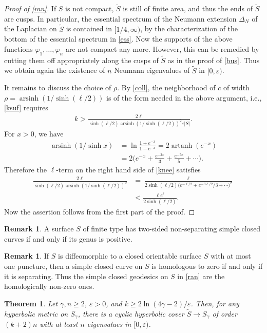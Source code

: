 \documentclass[a4paper,11pt]{amsart}
\numberwithin{equation}{section}
\newtheorem{thm}[equation]{Theorem}
\theoremstyle{definition}
\newtheorem{rem}[equation]{Remark}
\def\ve{\varepsilon}
\def\vf{\varphi}
\DeclareMathOperator{\arsinh}{arsinh}
\DeclareMathOperator{\artanh}{artanh}
\begin{document}
\begin{proof}[Proof of \cref{ran}]
If $S$ is not compact, $\tilde S$ is still of finite area, and thus the ends of $\tilde S$ are cusps.
In particular, the essential spectrum of the Neumann extension $\Delta_N$ of the Laplacian on $\tilde S$ is contained in $[1/4,\infty)$,
by the characterization of the bottom of the essential spectrum in \eqref{ess}.
Now the supports of the above functions $\vf_1,\dots,\vf_n$ are not compact any more.
However, this can be remedied by cutting them off appropriately along the cusps of $\tilde S$ as in the proof of \cref{bus}.
Thus we obtain again the existence of $n$ Neumann eigenvalues of $\tilde S$ in $[0,\ve)$.

It remains to discuss the choice of $\rho$.
By \cref{coll}, the neighborhood of $c$ of width $\rho=\arsinh(1/\sinh(\ell/2))$ is of the form needed in the above argument, i.e., \eqref{ksuf} requires
\begin{align}\label{knee}
  k > \frac{2\ell}{\sinh(\ell/2)\arsinh(1/\sinh(\ell/2))^2\ve|S|}.
\end{align}
For $x>0$, we have
\begin{align*}
  \arsinh(1/\sinh x)
  &= \ln\frac{1+e^{-x}}{1-e^{-x}}
  = 2\artanh(e^{-x}) \\
  &= 2\big(e^{-x}+\frac{e^{-3x}}{3}+\frac{e^{-5x}}{5}+\cdots\big).
\end{align*}
Therefore the $\ell$-term on the right hand side of \eqref{knee} satisfies
\begin{align*}
  \frac{2\ell}{\sinh(\ell/2)\arsinh(1/\sinh(\ell/2))^2} 
  &
  = \frac{\ell}{2\sinh(\ell/2)\big(e^{-\ell/2}+e^{-3\ell/2}/3+\cdots\big)^2} \\
  &
  < \frac{\ell e^{\ell}}{2\sinh(\ell/2)}.
\end{align*}
Now the assertion follows from the first part of the proof. 
\end{proof}

\begin{rem}
A surface $S$ of finite type has two-sided non-separating simple closed curves if and only if its genus is positive.
\end{rem}

\begin{rem}
If $S$ is diffeomorphic to a closed orientable surface $S$ with at most one puncture, then a simple closed curve on $S$ is homologous to zero if and only if it is separating.
Thus the simple closed geodesics on $S$ in \cref{ran} are the homologically non-zero ones.
\end{rem}

\begin{thm}\label{rancor}
Let $\gamma,n\ge2$, $\ve>0$, and $k\ge2\ln(4\gamma-2)/\ve$.
Then, for any hyperbolic metric on $S_\gamma$, there is a cyclic hyperbolic cover $\tilde S\to S_\gamma$ of order $(k+2)n$ with at least $n$ eigenvalues in $[0,\ve)$.
\end{thm}
\end{document}
